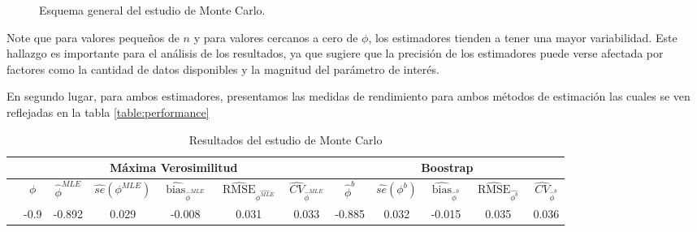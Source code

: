 \begin{figure}[h]
\begin{minipage}{0.45\textwidth}
    \caption{Esquema general del estudio de Monte Carlo.}
    \label{fig:monte_carlo_res2}
    \end{minipage}
\end{figure}

Note que para valores pequeños de $n$ y para valores cercanos a cero de $\phi$, 
los estimadores tienden a tener una mayor variabilidad.
Este hallazgo es importante para el análisis de los resultados, 
ya que sugiere que la precisión de los estimadores puede verse afectada por factores como la cantidad de datos 
disponibles y la magnitud del parámetro de interés.

En segundo lugar, para ambos estimadores, presentamos las medidas de rendimiento para ambos métodos de estimación
las cuales se ven reflejadas en la tabla \ref{table:performance}
\begin{table}[h]
    \centering
    \caption{Resultados del estudio de Monte Carlo}
    \resizebox{18cm}{!} {
    \begin{tabular}{|c|cccccc|ccccc|}
    \hline
    \rowcolor[HTML]{FFFFFF} 
    \multicolumn{1}{|l|}{\cellcolor[HTML]{FFFFFF}} & \multicolumn{6}{c|}{\cellcolor[HTML]{FFFFFF}\textbf{Máxima Verosimilitud}} & \multicolumn{5}{c|}{\cellcolor[HTML]{FFFFFF}\textbf{Boostrap}} \\ \hline
    \rowcolor[HTML]{FFFFFF} 
    \multicolumn{1}{|l|}{\cellcolor[HTML]{FFFFFF}n} & \multicolumn{1}{c|}{\cellcolor[HTML]{FFFFFF}\textbf{$\phi$}} & \multicolumn{1}{c|}{\cellcolor[HTML]{FFFFFF}\textbf{$\hat{\phi}^{MLE}$}} & \multicolumn{1}{c|}{\cellcolor[HTML]{FFFFFF}\textbf{$\hat{se}(\phi^{MLE})$}} & \multicolumn{1}{c|}{\cellcolor[HTML]{FFFFFF}\textbf{$\widehat{\operatorname{bias}}_{\hat{\phi}^{MLE}}$}} & \multicolumn{1}{c|}{\cellcolor[HTML]{FFFFFF}\textbf{$\widehat{\operatorname{RMSE}}_{\hat{\phi^{MLE}}}$}} & \textbf{$\widehat{CV}_{\hat{\phi}^{MLE}}$} & \multicolumn{1}{c|}{\cellcolor[HTML]{FFFFFF}\textbf{$\hat{\phi}^{b}$}} & \multicolumn{1}{c|}{\cellcolor[HTML]{FFFFFF}\textbf{$\hat{se}(\phi^{b})$}} & \multicolumn{1}{c|}{\cellcolor[HTML]{FFFFFF}\textbf{$\widehat{\operatorname{bias}}_{\hat{\phi}^{b}}$}} & \multicolumn{1}{c|}{\cellcolor[HTML]{FFFFFF}\textbf{$\widehat{\operatorname{RMSE}}_{\hat{\phi^{b}}}$}} & \textbf{$\widehat{CV}_{\hat{\phi}^{b}}$} \\ \hline
     & \multicolumn{1}{c|}{-0.9} & \multicolumn{1}{c|}{-0.892} & \multicolumn{1}{c|}{0.029} & \multicolumn{1}{c|}{-0.008} & \multicolumn{1}{c|}{0.031} & 0.033 & \multicolumn{1}{c|}{-0.885} & \multicolumn{1}{c|}{0.032} & \multicolumn{1}{c|}{-0.015} & \multicolumn{1}{c|}{0.035} & 0.036 \\ \cline{2-12} 

\end{tabular}}
\end{table}
